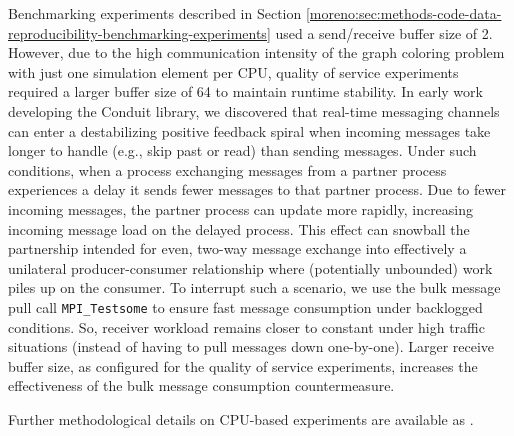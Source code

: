 Benchmarking experiments described in Section \ref{moreno:sec:methods-code-data-reproducibility-benchmarking-experiments} used a send/receive buffer size of 2.
However, due to the high communication intensity of the graph coloring problem with just one simulation element per CPU, quality of service experiments required a larger buffer size of 64 to maintain runtime stability.
In early work developing the Conduit library, we discovered that real-time messaging channels can enter a destabilizing positive feedback spiral when incoming messages take longer to handle (e.g., skip past or read) than sending messages.
Under such conditions, when a process exchanging messages from a partner process experiences a delay it sends fewer messages to that partner process.
Due to fewer incoming messages, the partner process can update more rapidly, increasing incoming message load on the delayed process.
This effect can snowball the partnership intended for even, two-way message exchange into effectively a unilateral producer-consumer relationship where (potentially unbounded) work piles up on the consumer.
To interrupt such a scenario, we use the bulk message pull call \verb|MPI_Testsome| to ensure fast message consumption under backlogged conditions.
So, receiver workload remains closer to constant under high traffic situations (instead of having to pull messages down one-by-one).
Larger receive buffer size, as configured for the quality of service experiments, increases the effectiveness of the bulk message consumption countermeasure.

Further methodological details on CPU-based experiments are available as \cite{moreno2022best}.
